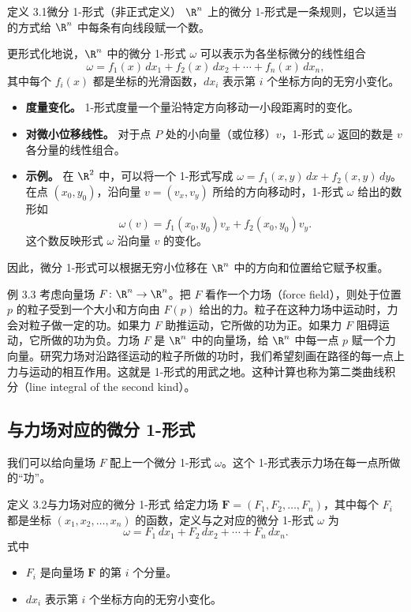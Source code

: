 \begin{statement}{定义 3.1}{微分 1-形式（非正式定义）}
$\R^n$ 上的微分 1-形式是一条规则，它以适当的方式给 $\R^n$ 中每条有向线段赋一个数。

更形式化地说，$\R^n$ 中的微分 1-形式 $\omega$ 可以表示为各坐标微分的线性组合
\[
  \omega=f_1(x)\,dx_1+f_2(x)\,dx_2+\cdots+f_n(x)\,dx_n,
\]
其中每个 $f_i(x)$ 都是坐标的光滑函数，$dx_i$ 表示第 $i$ 个坐标方向的无穷小变化。
\end{statement}

\begin{itemize}
\item \textbf{度量变化。} 1-形式度量一个量沿特定方向移动一小段距离时的变化。
\item \textbf{对微小位移线性。} 对于点 $P$ 处的小向量（或位移）$v$，1-形式 $\omega$ 返回的数是 $v$ 各分量的线性组合。
\item \textbf{示例。} 在 $\R^2$ 中，可以将一个 1-形式写成 $\omega=f_1(x,y)\,dx+f_2(x,y)\,dy$。在点 $(x_0,y_0)$，沿向量 $v=(v_x,v_y)$ 所给的方向移动时，1-形式 $\omega$ 给出的数形如
\[
  \omega(v)=f_1(x_0,y_0)v_x+f_2(x_0,y_0)v_y.
\]
这个数反映形式 $\omega$ 沿向量 $v$ 的变化。
\end{itemize}
因此，微分 1-形式可以根据无穷小位移在 $\R^n$ 中的方向和位置给它赋予权重。

\begin{statement}{例 3.3}{}
考虑向量场 $F\colon\R^n\to\R^n$。把 $F$ 看作一个力场（force field），则处于位置 $p$ 的粒子受到一个大小和方向由 $F(p)$ 给出的力。粒子在这种力场中运动时，力会对粒子做一定的功。如果力 $F$ 助推运动，它所做的功为正。如果力 $F$ 阻碍运动，它所做的功为负。力场 $F$ 是 $\R^n$ 中的向量场，给 $\R^n$ 中每一点 $p$ 赋一个力向量。研究力场对沿路径运动的粒子所做的功时，我们希望刻画在路径的每一点上力与运动的相互作用。这就是 1-形式的用武之地。这种计算也称为第二类曲线积分（line integral of the second kind）。
\end{statement}

\subsection{与力场对应的微分 1-形式}

我们可以给向量场 $F$ 配上一个微分 1-形式 $\omega$。这个 1-形式表示力场在每一点所做的“功”。

\begin{statement}{定义 3.2}{与力场对应的微分 1-形式}
给定力场 $\symbf{F}=(F_1,F_2,\dots,F_n)$，其中每个 $F_i$ 都是坐标 $(x_1,x_2,\dots,x_n)$ 的函数，定义与之对应的微分 1-形式 $\omega$ 为
\[
  \omega=F_1\,dx_1+F_2\,dx_2+\cdots+F_n\,dx_n.
\]
式中
\begin{itemize}
\item $F_i$ 是向量场 $\symbf{F}$ 的第 $i$ 个分量。
\item $dx_i$ 表示第 $i$ 个坐标方向的无穷小变化。
\end{itemize}
\end{statement}

